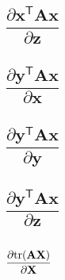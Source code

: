 \documentclass{article}
\newcommand{\trans}{\mathsf{T}}
\begin{document}
\subsection{\(\dfrac{\partial \mathbf{x}^\trans \mathbf{A} \mathbf{x}}{\partial \mathbf{z}}\)}

\subsection{\(\dfrac{\partial \mathbf{y}^\trans \mathbf{A} \mathbf{x}}{\partial \mathbf{x}}\)}

\subsection{\(\dfrac{\partial \mathbf{y}^\trans \mathbf{A} \mathbf{x}}{\partial \mathbf{y}}\)}

\subsection{\(\dfrac{\partial \mathbf{y}^\trans \mathbf{A} \mathbf{x}}{\partial \mathbf{z}}\)}

\subsection{\(\dfrac{\partial \textnormal{tr}(\mathbf{AX})}{\partial \mathbf{X}}\)}
\end{document}
